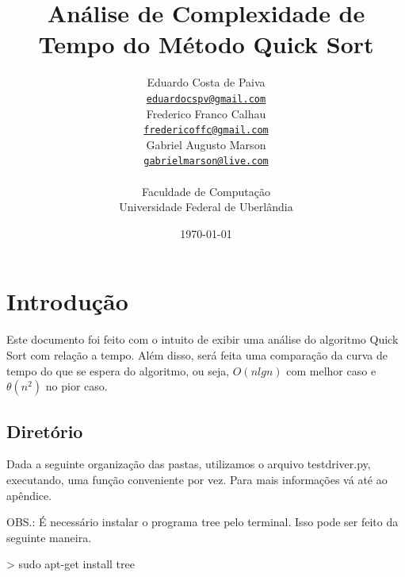 \documentclass[12pt,a4paper,twoside]{report}
\title{Análise de Complexidade de Tempo do Método Quick Sort}
\date{}
\author{Eduardo Costa de Paiva \\
\texttt{\small \url{eduardocspv@gmail.com}}\\
Frederico Franco Calhau \\
\texttt{\small \url{fredericoffc@gmail.com}}\\
Gabriel Augusto Marson \\
\texttt{\small \url{gabrielmarson@live.com}}\\
\vspace{1cm} \\
Faculdade de Computação \\
Universidade Federal de Uberlândia
}
\date{\today}
\begin{document}
  \maketitle
\listoffigures
\listoftables
\lstlistoflistings

\tableofcontents


\fancyhead[RE,LO]{\thesection}

\setlength{\parskip}{0.15in} %

\chapter{Introdução}
Este documento foi feito com o intuito de exibir uma análise do algoritmo Quick Sort
com relação a tempo. Além disso, será feita uma comparação da curva de tempo do que se espera do
algoritmo, ou seja, $O(nlgn)$ com melhor caso e $\theta(n^2)$ no pior caso.

\section{Diretório}

Dada a seguinte organização das pastas, utilizamos o arquivo testdriver.py,  executando, uma função conveniente por vez. Para mais informações vá até ao apêndice.

OBS.: É necessário instalar o programa tree pelo terminal. Isso pode ser feito da seguinte maneira.

\begin{terminal}
> sudo apt-get install tree
\end{terminal}
\end{document}
